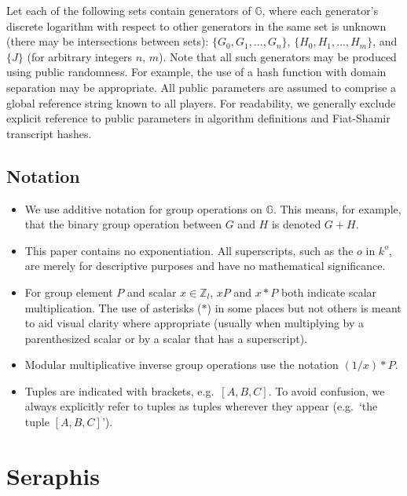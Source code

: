 Let each of the following sets contain generators of $\mathbb{G}$, where each generator's discrete logarithm with respect to other generators in the same set is unknown (there may be intersections between sets): $\{G_0, G_1,...,G_n\}$, $\{H_0, H_1,...,H_m\}$, and $\{J\}$ (for arbitrary integers $n$, $m$). Note that all such generators may be produced using public randomness. For example, the use of a hash function with domain separation may be appropriate. All public parameters are assumed to comprise a global reference string known to all players. For readability, we generally exclude explicit reference to public parameters in algorithm definitions and Fiat-Shamir transcript hashes.


\subsection{Notation}
\label{subsec:preliminaries-notation}

\begin{itemize}
    \item We use additive notation for group operations on $\mathbb{G}$. This means, for example, that the binary group operation between $G$ and $H$ is denoted $G + H$.

    \item This paper contains no exponentiation. All superscripts, such as the $o$ in $k^o$, are merely for descriptive purposes and have no mathematical significance.

    \item For group element $P$ and scalar $x \in \mathbb{Z}_l$, $x P$ and $x*P$ both indicate scalar multiplication. The use of asterisks ($*$) in some places but not others is meant to aid visual clarity where appropriate (usually when multiplying by a parenthesized scalar or by a scalar that has a superscript).

    \item Modular multiplicative inverse group operations use the notation $(1/x)*P$.

    \item Tuples are indicated with brackets, e.g.\ $[A, B, C]$. To avoid confusion, we always explicitly refer to tuples as tuples wherever they appear (e.g.\ `the tuple $[A, B, C]$').
\end{itemize}



\section{Seraphis}
\label{sec:seraphis}

